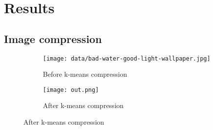 
\section{Results}

\subsection{Image compression}

\begin{figure}[ht!]
    \centering
    \begin{subfigure}[t]{1\textwidth}
        \centering
        \texttt{[image: data/bad-water-good-light-wallpaper.jpg]}
        \caption{Before k-means compression}
    \end{subfigure}
    \begin{subfigure}[t]{1\textwidth}
        \centering
        \texttt{[image: out.png]}
        \caption{After k-means compression}
    \end{subfigure}
\end{figure}
